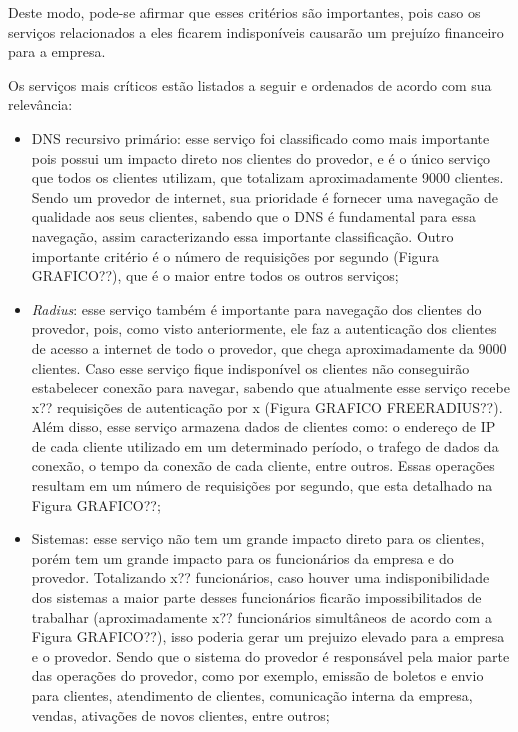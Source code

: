 Deste modo, pode-se afirmar que esses critérios são importantes, pois caso os serviços relacionados a eles ficarem indisponíveis causarão 
um prejuízo financeiro para a empresa. 

Os serviços mais críticos estão listados a seguir e ordenados de acordo com sua relevância:
\begin{itemize}
 \item \ac{DNS} recursivo primário: esse serviço foi classificado como mais importante pois possui um impacto direto nos clientes do provedor, e 
 é o único serviço que todos os clientes utilizam, que totalizam aproximadamente 9000 clientes. Sendo um provedor de internet, sua prioridade é 
 fornecer uma navegação de qualidade aos seus clientes, sabendo que o \ac{DNS} é fundamental para essa navegação, assim caracterizando essa 
 importante classificação. Outro importante critério é o número de requisições por segundo (Figura GRAFICO??), que é o maior entre todos os 
 outros serviços;
 
 \item \textit{Radius}: esse serviço também é importante para navegação dos clientes do provedor, pois, como visto anteriormente, ele faz a
 autenticação dos clientes de acesso a internet de todo o provedor, que chega aproximadamente da 9000 clientes. Caso esse serviço fique 
 indisponível os clientes não conseguirão estabelecer conexão para navegar, sabendo que atualmente esse serviço recebe x?? requisições de
 autenticação por x (Figura GRAFICO FREERADIUS??). Além disso, esse serviço armazena dados de clientes como: o endereço de \ac{IP} de cada 
 cliente utilizado em um determinado período, o trafego de dados da conexão, o tempo da conexão de cada cliente, entre outros. 
 Essas operações resultam em um número de requisições por segundo, que esta detalhado na Figura GRAFICO??;
 
 \item Sistemas: esse serviço não tem um grande impacto direto para os clientes, porém tem um grande impacto para os funcionários da empresa e 
 do provedor. Totalizando x?? funcionários, caso houver uma indisponibilidade dos sistemas a maior parte desses funcionários ficarão 
 impossibilitados de trabalhar (aproximadamente x?? funcionários simultâneos de acordo com a Figura GRAFICO??), isso poderia gerar um prejuizo 
 elevado para a empresa e o provedor. Sendo que o sistema do provedor é responsável pela maior parte das operações do provedor, 
 como por exemplo, emissão de boletos e envio para clientes, atendimento de clientes, comunicação interna da empresa, vendas, 
 ativações de novos clientes, entre outros;
 

\end{itemize}
